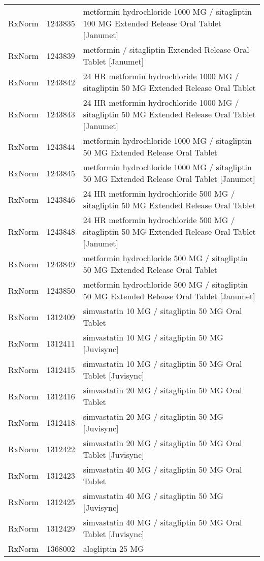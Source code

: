 \begin{longtable}{p{}p{}p{}}
  RxNorm & 1243835 & metformin hydrochloride 1000 MG / sitagliptin 100 MG Extended Release Oral Tablet [Janumet] \\ 
  RxNorm & 1243839 & metformin / sitagliptin Extended Release Oral Tablet [Janumet] \\ 
  RxNorm & 1243842 & 24 HR metformin hydrochloride 1000 MG / sitagliptin 50 MG Extended Release Oral Tablet \\ 
  RxNorm & 1243843 & 24 HR metformin hydrochloride 1000 MG / sitagliptin 50 MG Extended Release Oral Tablet [Janumet] \\ 
  RxNorm & 1243844 & metformin hydrochloride 1000 MG / sitagliptin 50 MG Extended Release Oral Tablet \\ 
  RxNorm & 1243845 & metformin hydrochloride 1000 MG / sitagliptin 50 MG Extended Release Oral Tablet [Janumet] \\ 
  RxNorm & 1243846 & 24 HR metformin hydrochloride 500 MG / sitagliptin 50 MG Extended Release Oral Tablet \\ 
  RxNorm & 1243848 & 24 HR metformin hydrochloride 500 MG / sitagliptin 50 MG Extended Release Oral Tablet [Janumet] \\ 
  RxNorm & 1243849 & metformin hydrochloride 500 MG / sitagliptin 50 MG Extended Release Oral Tablet \\ 
  RxNorm & 1243850 & metformin hydrochloride 500 MG / sitagliptin 50 MG Extended Release Oral Tablet [Janumet] \\ 
  RxNorm & 1312409 & simvastatin 10 MG / sitagliptin 50 MG Oral Tablet \\ 
  RxNorm & 1312411 & simvastatin 10 MG / sitagliptin 50 MG [Juvisync] \\ 
  RxNorm & 1312415 & simvastatin 10 MG / sitagliptin 50 MG Oral Tablet [Juvisync] \\ 
  RxNorm & 1312416 & simvastatin 20 MG / sitagliptin 50 MG Oral Tablet \\ 
  RxNorm & 1312418 & simvastatin 20 MG / sitagliptin 50 MG [Juvisync] \\ 
  RxNorm & 1312422 & simvastatin 20 MG / sitagliptin 50 MG Oral Tablet [Juvisync] \\ 
  RxNorm & 1312423 & simvastatin 40 MG / sitagliptin 50 MG Oral Tablet \\ 
  RxNorm & 1312425 & simvastatin 40 MG / sitagliptin 50 MG [Juvisync] \\ 
  RxNorm & 1312429 & simvastatin 40 MG / sitagliptin 50 MG Oral Tablet [Juvisync] \\ 
  RxNorm & 1368002 & alogliptin 25 MG \\ 

\end{longtable}
